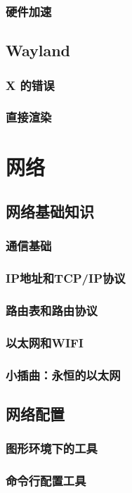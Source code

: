 \documentclass[amstex,twoside]{ctexbook}
\begin{document}
\subsection{  硬件加速	}
\section{  Wayland	}
\subsection{ X 的错误	}
\subsection{  直接渲染}

\chapter{网络}
\section{  网络基础知识}
\subsection{  通信基础}
\subsection{  IP地址和TCP/IP协议}
\subsection{  路由表和路由协议}
\subsection{ 以太网和WIFI}
\subsection*{  小插曲：永恒的以太网}
\section{  网络配置}
\subsection{  图形环境下的工具	}
\subsection{ 命令行配置工具}
\end{document}
